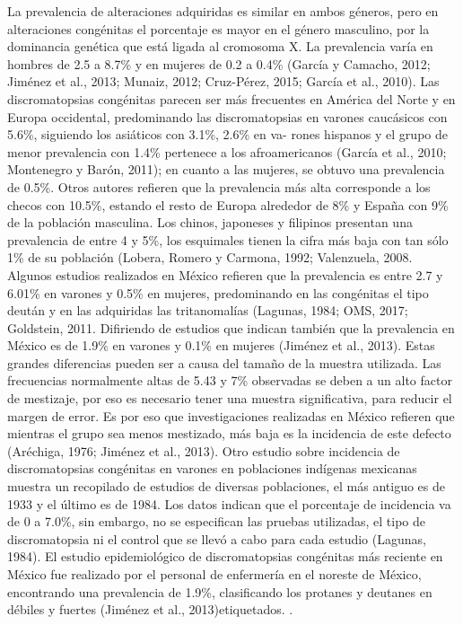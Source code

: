 \documentclass[10pt]{article}
\begin{document}
La prevalencia de alteraciones adquiridas es similar en ambos géneros, pero en alteraciones congénitas el porcentaje es mayor en el género masculino, por la dominancia genética que está ligada al cromosoma X. La prevalencia varía en hombres de 2.5 a 8.7\% y en mujeres de 0.2 a 0.4\% (García y Camacho, 2012; Jiménez et al., 2013; Munaiz, 2012; Cruz-Pérez, 2015; García et al., 2010)\cite{IEEEreferencias:Ref27}.
Las discromatopsias congénitas parecen ser más frecuentes en América del Norte y en Europa occidental, predominando las discromatopsias en varones caucásicos con 5.6\%, siguiendo los asiáticos con 3.1\%, 2.6\% en va- rones hispanos y el grupo de menor prevalencia con 1.4\% pertenece a los afroamericanos (García et al., 2010; Montenegro y Barón, 2011); en cuanto a las mujeres, se obtuvo una prevalencia de 0.5\%\cite{IEEEreferencias:Ref27}.
Otros autores refieren que la prevalencia más alta corresponde a los checos con 10.5\%, estando el resto de Europa alrededor de 8\% y España con 9\% de la población masculina\cite{IEEEreferencias:Ref27}.
Los chinos, japoneses y filipinos presentan una prevalencia de entre 4 y 5\%, los esquimales tienen la cifra más baja con tan sólo 1\% de su población (Lobera, Romero y Carmona, 1992; Valenzuela, 2008. Algunos estudios realizados en México refieren que la prevalencia es entre 2.7 y 6.01\% en varones y 0.5\% en mujeres, predominando en las congénitas el tipo deután y en las adquiridas las tritanomalías (Lagunas, 1984; OMS, 2017; Goldstein, 2011. Difiriendo de estudios que indican también que la prevalencia en México es de 1.9\% en varones y 0.1\% en mujeres (Jiménez et al., 2013). Estas grandes diferencias pueden ser a causa del tamaño de la muestra utilizada. Las frecuencias normalmente altas de 5.43 y 7\% observadas se deben a un alto factor de mestizaje, por eso es necesario tener una muestra significativa, para reducir el margen de error. Es por eso que investigaciones realizadas en México refieren que mientras el grupo sea menos mestizado, más baja es la incidencia de este defecto (Aréchiga, 1976; Jiménez et al., 2013).
Otro estudio sobre incidencia de discromatopsias congénitas en varones en poblaciones indígenas mexicanas muestra un recopilado de estudios de diversas poblaciones, el más antiguo es de 1933 y el último es de 1984. Los datos indican que el porcentaje de incidencia va de 0 a 7.0\%, sin embargo, no se especifican las pruebas utilizadas, el tipo de discromatopsia ni el control que se llevó a cabo para cada estudio (Lagunas, 1984)\cite{IEEEreferencias:Ref27}.
El estudio epidemiológico de discromatopsias congénitas más reciente en México fue realizado por el personal de enfermería en el noreste de México, encontrando una prevalencia de 1.9\%, clasificando los protanes y deutanes en débiles y fuertes (Jiménez et al., 2013)etiquetados. \cite{IEEEreferencias:Ref27}.
\end{document}
